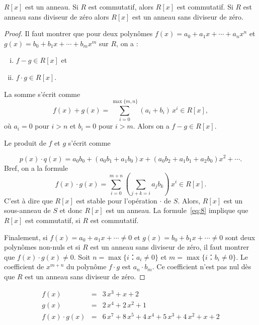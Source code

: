\begin{theorem}
  \label{thr:51}
  $R[x]$ est un anneau. Si $R$ est commutatif, alors $R[x]$ est commutatif. Si $R$ est anneau sans diviseur de zéro    alors $R[x]$ est un  anneau sans diviseur de zéro. 
\end{theorem}
\begin{proof}
  Il faut montrer que
  pour deux polynômes $f(x) = a_0 + a_1 x + \cdots + a_n x^n$ et $g(x) = b_0 + b_1x + \cdots + b_m x^m$ sur $R$, on a : 
  \begin{enumerate}[i)]
  \item $f- g ∈ R[x]$ et
  \item $f ⋅ g ∈R[x]$. 
  \end{enumerate}
  La somme s'écrit comme
  \begin{equation}
    \label{eq:47}
    f(x) + g(x) = ∑_{i=0}^{\max\{m,n\}} (a_i +  b_i) \, x^i  ∈R[x], 
  \end{equation}
  où $a_i = 0$ pour $i>n$ et $b_i = 0$ pour $i>m$. 
  Alors
  on a $f-g ∈ R[x]$. 
  
  Le    produit de $f$ et $g$ s'écrit comme

  \begin{equation}
  \label{ceq:21}
  p(x) ⋅q(x) = a_0 b_0 + (a_0b_1 +a_1b_0) x + (a_0b_2+ a_1b_1 + a_2b_0)x^2 + \cdots .
\end{equation}
Bref, on a la formule 
  \begin{equation}
    \label{eq:8}
    f(x) ⋅g(x) = ∑_{i=0}^{m+n} ( ∑_{j+k = i} a_j b_k) \, x^i ∈ R[x]. 
  \end{equation}
  C'est à dire que $R[x]$ est stable pour l'opération $⋅$ de $S$.  Alors, $R[x]$ est un sous-anneau de $S$ et 
  donc $R[x]$ est un anneau. La formule~\eqref{eq:8} implique que
  $R[x]$ est commutatif, si $R$ est commutatif.

  Finalement, si $f(x) = a_0 + a_1 x + \cdots ≠ 0$ et
  $g(x) = b_0 + b_1 x + \cdots ≠ 0 $ sont deux polynômes non-nuls et si $R$ est un 
  anneau sans diviseur de zéro, il faut montrer que $f(x) ⋅ g(x) ≠
  0$. Soit $n = \max\{ i ：a_i ≠0 \}$ et $m = \max\{ i ：b_i ≠0 \}$. Le coefficient de $x^{m+n}$ du polynôme $f⋅g$ est $a_n ⋅b_m$. Ce coefficient n'est pas nul dès que $R$  est un 
  anneau sans diviseur de zéro. 
\end{proof}

\begin{example}
  \label{exe:33}
  \begin{eqnarray*}
    f(x) & = &  3 \, x^{3} + x + 2 \\
    g(x) & = & 2 \, x^{4} + 2 \, x^{2} + 1 \\
    f(x) ⋅g(x) & = & 6 \, x^{7} + 8 \, x^{5} + 4 \, x^{4} + 5 \, x^{3} + 4 \,  x^{2} + x + 2 \\ 
  \end{eqnarray*}
\end{example}



